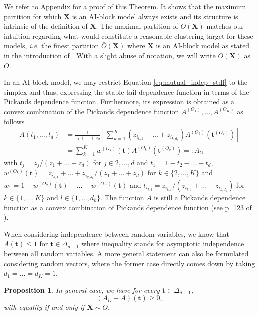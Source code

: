 \documentclass[11pt]{article}
\newtheorem{proposition}{Proposition}
\begin{document}
	We refer to Appendix for a proof of this Theorem. It shows that the maximum partition for which $\textbf{X}$ is an AI-block model always exists and its structure is intrinsic of the definition of $\textbf{X}$. The maximal partition of $\bar{O}(\textbf{X})$ matches our intuition regarding what would constitute a reasonable clustering target for these models, \emph{i.e.} the finest partition $\bar{O}(\textbf{X})$ where $\textbf{X}$ is an AI-block model as stated in the introduction of \cite{NIPS2017_37d097ca}. With a slight abuse of notation, we will write $\bar{O}(\textbf{X})$ as $\bar{O}$. 
	
	In an AI-block model, we may restrict Equation \eqref{eq:mutual_indep_stdf} to the simplex and thus, expressing the stable tail dependence function in terms of the Pickands dependence function. Furthermore, its expression is obtained as a convex combination of the Pickands dependence function $A^{(O_1)}, \dots, A^{(O_K)}$ as follows 
	\begin{align*}
		A(t_1, \dots, t_d) &= \frac{1}{z_1+\dots+z_d} \left[ \sum_{k=1}^K (z_{i_{k,1}} + \dots + z_{i_{k,d_k}}) A^{(O_k)}(\textbf{t}^{(O_k)}) \right] \\
		&= \sum_{k=1}^K w^{(O_k)}(\textbf{t}) A^{(O_k)}(\textbf{t}^{(O_k)}) =: A_O
	\end{align*}
	with $t_j = z_j / (z_1+\dots+z_d)$ for $j \in {2,\dots, d}$ and $t_1 = 1-t_2 - \dots - t_d$, $w^{(O_k)}(\textbf{t})  = z_{i_{k,1}} + \dots + z_{i_{k,d_k}} / (z_1 + \dots + z_{d})$ for $k \in \{2, \dots, K\}$ and $w_1 = 1-w^{(O_2)}(\textbf{t})-\dots -w^{(O_K)}(\textbf{t})$ and $t_{i_{k,l}} = z_{i_{k,l}} / (z_{i_{k,1}} + \dots + z_{i_{k,d_k}})$ for $k \in \{1, \dots, K\}$ and $l \in \{1, \dots, d_k\}$. The function $A$ is still a Pickands dependence function as a convex combination of Pickands dependence function (see p. 123 of \cite{falk2010laws}).
	
	When considering independence between random variables, we know that $A(\textbf{t}) \leq 1$ for $\textbf{t} \in \Delta_{d-1}$ where inequality stands for asymptotic independence between all random variables. A more general statement can also be formulated considering random vectors, where the former case directly comes down by taking $d_1 = \dots = d_K = 1$.
	
	\begin{proposition}
	\label{prop:ineq}
		In general case, we have for every $\textbf{t} \in \Delta_{d-1}$, 
		\begin{equation*}
			\left(A_{O} - A\right) (\textbf{t}) \geq 0,
		\end{equation*}
		with equality if and only if $\textbf{X} \sim O$.
	\end{proposition}
	
\end{document}
